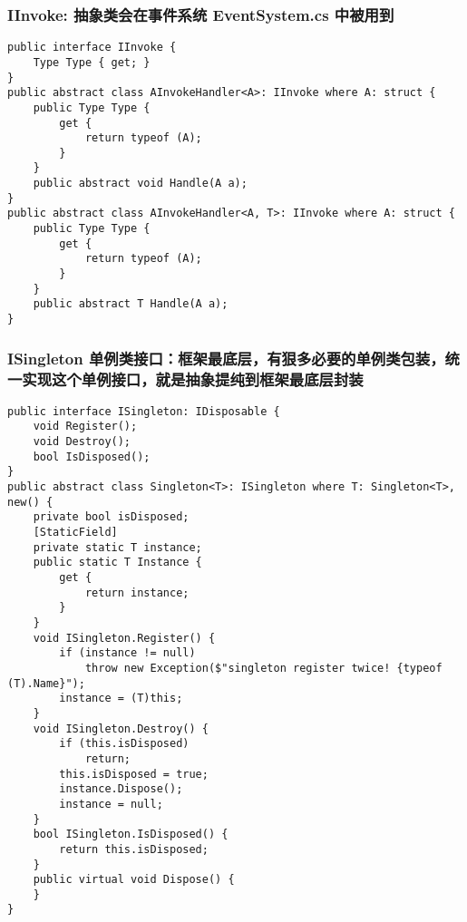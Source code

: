\documentclass[9pt, b5paper]{article}
\begin{document}
\subsubsection{IInvoke: 抽象类会在事件系统 EventSystem.cs 中被用到}
\label{sec-6-1-2}
\begin{verbatim}
public interface IInvoke {
    Type Type { get; }
}
public abstract class AInvokeHandler<A>: IInvoke where A: struct {
    public Type Type {
        get {
            return typeof (A);
        }
    }
    public abstract void Handle(A a);
}
public abstract class AInvokeHandler<A, T>: IInvoke where A: struct {
    public Type Type {
        get {
            return typeof (A);
        }
    }
    public abstract T Handle(A a);
}
\end{verbatim}
\subsubsection{ISingleton 单例类接口：框架最底层，有狠多必要的单例类包装，统一实现这个单例接口，就是抽象提纯到框架最底层封装}
\label{sec-6-1-3}
\begin{verbatim}
public interface ISingleton: IDisposable {
    void Register();
    void Destroy();
    bool IsDisposed();
}
public abstract class Singleton<T>: ISingleton where T: Singleton<T>, new() {
    private bool isDisposed;
    [StaticField]
    private static T instance;
    public static T Instance {
        get {
            return instance;
        }
    }
    void ISingleton.Register() {
        if (instance != null) 
            throw new Exception($"singleton register twice! {typeof (T).Name}");
        instance = (T)this;
    }
    void ISingleton.Destroy() {
        if (this.isDisposed) 
            return;
        this.isDisposed = true;
        instance.Dispose();
        instance = null;
    }
    bool ISingleton.IsDisposed() {
        return this.isDisposed;
    }
    public virtual void Dispose() {
    }
}
\end{verbatim}
\end{document}
